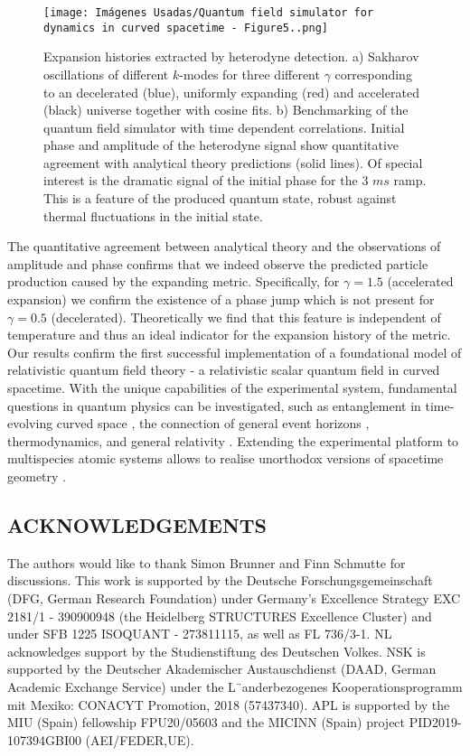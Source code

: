 \documentclass[11pt,twocolumn,letterpaper]{article}
\newcounter{ns}
\begin{document}
\begin{figure*}[ht]
    \centering
    \texttt{[image: Imágenes Usadas/Quantum field simulator for dynamics in curved spacetime - Figure5..png]}
    \caption{Expansion histories extracted by heterodyne detection. a) Sakharov oscillations of different $k$-modes for three different $\gamma$ corresponding to an decelerated (blue), uniformly expanding (red) and accelerated (black) universe together with cosine fits. b) Benchmarking of the quantum field simulator with time dependent correlations. Initial phase and amplitude of the heterodyne signal show quantitative agreement with analytical theory predictions \cite{Lb.32} (solid lines). Of special interest is the dramatic signal of the initial phase for the $3$ $ms$ ramp. This is a feature of the produced quantum state, robust against thermal fluctuations in the initial state.}
    \label{Figure5}
\end{figure*}

The quantitative agreement between analytical theory and the observations of amplitude and phase confirms that we indeed observe the predicted particle production caused by the expanding metric. Specifically, for $\gamma = 1.5$  (accelerated expansion) we confirm the existence of a phase jump which is not present for $\gamma = 0.5$ (decelerated). Theoretically we find that this feature is independent of temperature and thus an ideal indicator for the expansion history of the metric. Our results confirm the first successful implementation of a foundational model of relativistic quantum field theory - a relativistic scalar quantum field in curved spacetime. With the unique capabilities of the experimental system, fundamental questions in quantum physics can be investigated, such as entanglement in time-evolving curved space \cite{Lb.37, Lb.38, Lb.39}, the connection of general event horizons \cite{Lb.40}, thermodynamics, and general relativity \cite{Lb.41, Lb.42}. Extending the experimental platform to multispecies atomic systems allows to realise unorthodox versions of spacetime geometry \cite{Lb.43, Lb.44}.

\begin{center}
    \section{ ACKNOWLEDGEMENTS}
    \addtocounter{ns}{1}
\end{center}

The authors would like to thank Simon Brunner and Finn Schmutte for discussions. This work is supported by the Deutsche Forschungsgemeinschaft (DFG, German Research Foundation) under Germany’s Excellence Strategy EXC 2181/1 - 390900948 (the Heidelberg STRUCTURES Excellence Cluster) and under SFB 1225 ISOQUANT - 273811115, as well as FL 736/3-1. NL acknowledges support by the Studienstiftung des Deutschen Volkes. NSK is supported by the Deutscher Akademischer Austauschdienst (DAAD, German Academic Exchange Service) under the L¨anderbezogenes Kooperationsprogramm mit Mexiko: CONACYT Promotion, 2018 (57437340). APL is supported by the MIU (Spain) fellowship FPU20/05603 and the MICINN (Spain) project PID2019-107394GBI00 (AEI/FEDER,UE).\\
\end{document}
